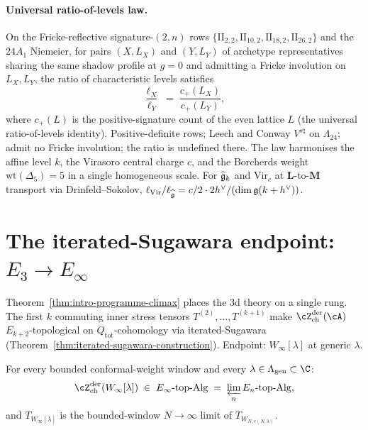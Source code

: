\paragraph{Universal ratio-of-levels law.}
On the Fricke-reflective signature-$(2,n)$ rows
$\{\mathrm{II}_{2,2}, \mathrm{II}_{10,2}, \mathrm{II}_{18,2},
\mathrm{II}_{26,2}\}$ and the $24 A_1$ Niemeier, for pairs
$(X, L_X)$ and $(Y, L_Y)$ of archetype representatives sharing
the same shadow profile at $g = 0$ and admitting a Fricke
involution on $L_X, L_Y$, the ratio of characteristic levels
satisfies
\[
 \frac{\ell_X}{\ell_Y}
 \;=\;
 \frac{c_+(L_X)}{c_+(L_Y)},
\]
where $c_+(L)$ is the positive-signature count of the
even lattice $L$ (the universal ratio-of-levels identity).
Positive-definite rows; Leech and Conway $V^{s\natural}$
on $\Lambda_{24}$; admit no Fricke involution; the ratio is
undefined there. The law
harmonises the affine level $k$, the Virasoro central charge
$c$, and the Borcherds weight $\mathrm{wt}(\Delta_5) = 5$ in a
single homogeneous scale. For $\widehat{\mathfrak{g}}_k$ and
$\mathrm{Vir}_c$ at $\mathbf L$-to-$\mathbf M$ transport via
Drinfeld--Sokolov, $\ell_{\mathrm{Vir}} / \ell_{\widehat{\mathfrak{g}}} =
c/2 \cdot 2h^\vee / (\dim\mathfrak{g} (k + h^\vee))$.

\section*{The iterated-Sugawara endpoint: $E_3 \to E_\infty$}

Theorem~\ref{thm:intro-programme-climax} places the 3d theory on
a single rung. The first $k$ commuting inner stress tensors
$T^{(2)},\ldots,T^{(k+1)}$ make
$\cZ^{\mathrm{der}}_{\mathrm{ch}}(\cA)$ $E_{k+2}$-topological
on $Q_{\mathrm{tot}}$-cohomology via iterated-Sugawara
(Theorem~\ref{thm:iterated-sugawara-construction}). Endpoint:
$W_\infty[\lambda]$ at generic $\lambda$.

\begin{maintheorem}
\label{thm:intro-climax-w-infty}
For every bounded conformal-weight window and every
$\lambda \in \Lambda_{\mathrm{gen}} \subset \C$:
\[
\cZ^{\mathrm{der}}_{\mathrm{ch}}(W_\infty[\lambda])
\;\in\;
E_\infty\text{-}\mathrm{top}\text{-}\mathrm{Alg}
\;=\;
\varprojlim_n E_n\text{-}\mathrm{top}\text{-}\mathrm{Alg},
\]
and $T_{W_\infty[\lambda]}$ is the bounded-window
$N \to \infty$ limit of $T_{W_{N,c(N,\lambda)}}$.
\end{maintheorem}

